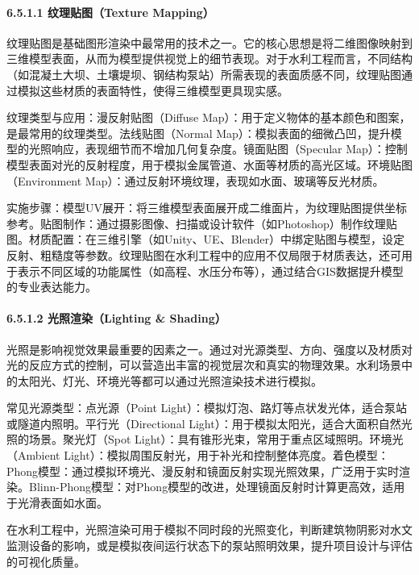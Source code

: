 \paragraph{6.5.1.1 纹理贴图（Texture Mapping）}\label{ux7eb9ux7406ux8d34ux56fetexture-mapping}

纹理贴图是基础图形渲染中最常用的技术之一。它的核心思想是将二维图像映射到三维模型表面，从而为模型提供视觉上的细节表现。对于水利工程而言，不同结构（如混凝土大坝、土壤堤坝、钢结构泵站）所需表现的表面质感不同，纹理贴图通过模拟这些材质的表面特性，使得三维模型更具现实感。

纹理类型与应用：漫反射贴图（Diffuse Map）：用于定义物体的基本颜色和图案，是最常用的纹理类型。法线贴图（Normal Map）：模拟表面的细微凸凹，提升模型的光照响应，表现细节而不增加几何复杂度。镜面贴图（Specular Map）：控制模型表面对光的反射程度，用于模拟金属管道、水面等材质的高光区域。环境贴图（Environment Map）：通过反射环境纹理，表现如水面、玻璃等反光材质。

实施步骤：模型UV展开：将三维模型表面展开成二维面片，为纹理贴图提供坐标参考。贴图制作：通过摄影图像、扫描或设计软件（如Photoshop）制作纹理贴图。材质配置：在三维引擎（如Unity、UE、Blender）中绑定贴图与模型，设定反射、粗糙度等参数。纹理贴图在水利工程中的应用不仅局限于材质表达，还可用于表示不同区域的功能属性（如高程、水压分布等），通过结合GIS数据提升模型的专业表达能力。

\paragraph{6.5.1.2 光照渲染（Lighting \& Shading）}\label{ux5149ux7167ux6e32ux67d3lighting-shading}

光照是影响视觉效果最重要的因素之一。通过对光源类型、方向、强度以及材质对光的反应方式的控制，可以营造出丰富的视觉层次和真实的物理效果。水利场景中的太阳光、灯光、环境光等都可以通过光照渲染技术进行模拟。

常见光源类型：点光源（Point Light）：模拟灯泡、路灯等点状发光体，适合泵站或隧道内照明。平行光（Directional Light）：用于模拟太阳光，适合大面积自然光照的场景。聚光灯（Spot Light）：具有锥形光束，常用于重点区域照明。环境光（Ambient Light）：模拟周围反射光，用于补光和控制整体亮度。着色模型：Phong模型：通过模拟环境光、漫反射和镜面反射实现光照效果，广泛用于实时渲染。Blinn-Phong模型：对Phong模型的改进，处理镜面反射时计算更高效，适用于光滑表面如水面。

在水利工程中，光照渲染可用于模拟不同时段的光照变化，判断建筑物阴影对水文监测设备的影响，或是模拟夜间运行状态下的泵站照明效果，提升项目设计与评估的可视化质量。

